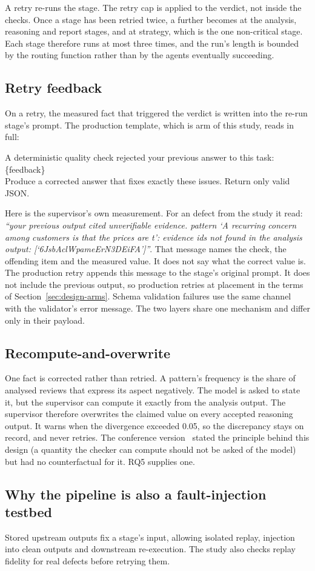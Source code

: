A retry re-runs the stage. The retry cap is applied to the verdict, not inside
the checks. Once a stage has been retried twice, a further 
becomes  at the analysis, reasoning and report stages, and
 at strategy, which is the one non-critical
stage. Each stage therefore runs at most three times, and the run's length is
bounded by the routing function rather than by the agents eventually
succeeding.

\subsection{Retry feedback}
\label{sec:system-feedback}

On a retry, the measured fact that triggered the verdict is written into the
re-run stage's prompt. The production template, which is arm  of this
study, reads in full:

\begin{prompttext}
A deterministic quality check rejected your previous answer to this task:\\[2pt]
\{feedback\}\\[2pt]
Produce a corrected answer that fixes exactly these issues. Return only valid
JSON.
\end{prompttext}

\noindent Here  is the supervisor's own measurement. For an
 defect from the study it read: \emph{``your previous output cited
unverifiable evidence. pattern `A recurring concern among customers is that the
prices are t': evidence ids not found in the analysis output:
[`6JsbAclWpameErN3DEiFA']''}. That message names the check, the offending item
and the measured value. It does not say what the correct value is. The
production retry appends this message to the stage's original prompt. It does
not include the previous output, so production retries at placement 
in the terms of Section~\ref{sec:design-arms}. Schema validation failures use
the same channel with the validator's error message. The two layers share one
mechanism and differ only in their payload.

\subsection{Recompute-and-overwrite}
\label{sec:system-overwrite}

One fact is corrected rather than retried. A pattern's frequency is the share of
analysed reviews that express its aspect negatively. The model is asked to
state it, but the supervisor can compute it exactly from the analysis output.
The supervisor therefore overwrites the claimed value on every accepted
reasoning output. It warns when the divergence exceeded 0.05, so the
discrepancy stays on record, and never retries. The conference
version~\citep{hoang2026eas} stated the principle behind this design (a
quantity the checker can compute should not be asked of the model) but had no
counterfactual for it. RQ5 supplies one.

\subsection{Why the pipeline is also a fault-injection testbed}
\label{sec:system-testbed}

Stored upstream outputs fix a stage's input, allowing isolated replay,
injection into clean outputs and downstream re-execution. The study also checks
replay fidelity for real defects before retrying them.
